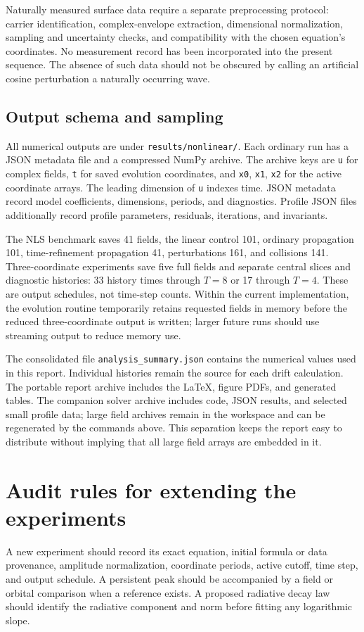 \documentclass[10pt,letterpaper]{article}
\numberwithin{equation}{section}
\begin{document}
Naturally measured surface data require a separate preprocessing protocol: carrier identification, complex-envelope extraction, dimensional normalization, sampling and uncertainty checks, and compatibility with the chosen equation's coordinates. No measurement record has been incorporated into the present sequence. The absence of such data should not be obscured by calling an artificial cosine perturbation a naturally occurring wave.

\subsection{Output schema and sampling}
All numerical outputs are under \texttt{results/nonlinear/}. Each ordinary run has a JSON metadata file and a compressed NumPy archive. The archive keys are \texttt{u} for complex fields, \texttt{t} for saved evolution coordinates, and \texttt{x0}, \texttt{x1}, \texttt{x2} for the active coordinate arrays. The leading dimension of \texttt{u} indexes time. JSON metadata record model coefficients, dimensions, periods, and diagnostics. Profile JSON files additionally record profile parameters, residuals, iterations, and invariants.

The NLS benchmark saves 41 fields, the linear control 101, ordinary propagation 101, time-refinement propagation 41, perturbations 161, and collisions 141. Three-coordinate experiments save five full fields and separate central slices and diagnostic histories: 33 history times through $T=8$ or 17 through $T=4$. These are output schedules, not time-step counts. Within the current implementation, the evolution routine temporarily retains requested fields in memory before the reduced three-coordinate output is written; larger future runs should use streaming output to reduce memory use.

The consolidated file \texttt{analysis\_summary.json} contains the numerical values used in this report. Individual histories remain the source for each drift calculation. The portable report archive includes the LaTeX, figure PDFs, and generated tables. The companion solver archive includes code, JSON results, and selected small profile data; large field archives remain in the workspace and can be regenerated by the commands above. This separation keeps the report easy to distribute without implying that all large field arrays are embedded in it.

\section{Audit rules for extending the experiments}
A new experiment should record its exact equation, initial formula or data provenance, amplitude normalization, coordinate periods, active cutoff, time step, and output schedule. A persistent peak should be accompanied by a field or orbital comparison when a reference exists. A proposed radiative decay law should identify the radiative component and norm before fitting any logarithmic slope.
\end{document}
